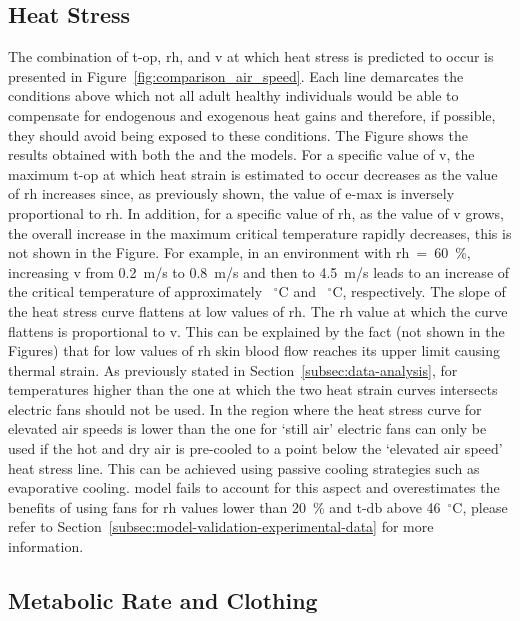 \subsection{Heat Stress}\label{subsec:heat-stress}

The combination of \ac{t-op}, \ac{rh}, and \ac{v} at which heat stress is predicted to occur is presented in Figure~\ref{fig:comparison_air_speed}.
Each line demarcates the conditions above which not all adult healthy individuals would be able to compensate for endogenous and exogenous heat gains and therefore, if possible, they should avoid being exposed to these conditions.
The Figure shows the results obtained with both the  and the  models.
For a specific value of \ac{v}, the maximum \ac{t-op} at which heat strain is estimated to occur decreases as the value of \ac{rh} increases since, as previously shown, the value of \ac{e-max} is inversely proportional to \ac{rh}.
In addition, for a specific value of \ac{rh}, as the value of \ac{v} grows, the overall increase in the maximum critical temperature rapidly decreases, this is not shown in the Figure.
For example, in an environment with \ac{rh}~=~60~\%, increasing \ac{v} from 0.2~m/s to 0.8~m/s and then to 4.5~m/s leads to an increase of the critical temperature of approximately ~$^{\circ}$C and ~$^{\circ}$C, respectively.
The slope of the heat stress curve flattens at low values of \ac{rh}.
The \ac{rh} value at which the curve flattens is proportional to \ac{v}.
This can be explained by the fact (not shown in the Figures) that for low values of \ac{rh} skin blood flow reaches its upper limit causing thermal strain.
As previously stated in Section~\ref{subsec:data-analysis}, for temperatures higher than the one at which the two heat strain curves intersects electric fans should not be used.
In the region where the heat stress curve for elevated air speeds is lower than the one for `still air' electric fans can only be used if the hot and dry air is pre-cooled to a point below the `elevated air speed' heat stress line.
This can be achieved using passive cooling strategies such as evaporative cooling.
 model fails to account for this aspect and overestimates the benefits of using fans for \ac{rh} values lower than 20~\% and \ac{t-db} above 46~$^{\circ}$C, please refer to Section~\ref{subsec:model-validation-experimental-data} for more information.

\subsection{Metabolic Rate and Clothing}\label{subsec:met-clo}

